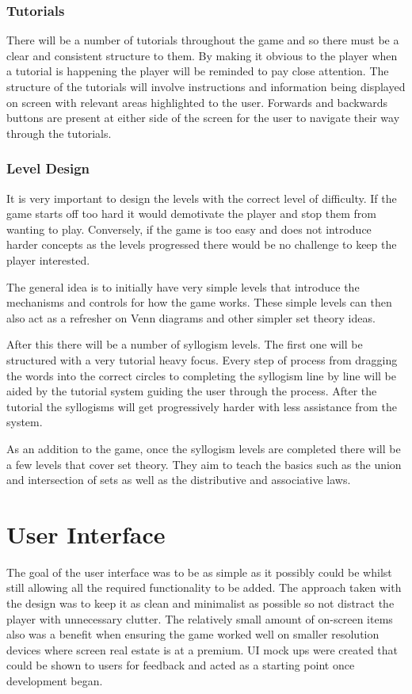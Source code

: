 \documentclass[12pt,a4paper]{report}
\begin{document}
\subsubsection{Tutorials}
There will be a number of tutorials throughout the game and so there must be a clear and consistent structure to them. By making it obvious to the player when a tutorial is happening the player will be reminded to pay close attention. The structure of the tutorials will involve instructions and information being displayed on screen with relevant areas highlighted to the user. Forwards and backwards buttons are present at either side of the screen for the user to navigate their way through the tutorials. 

\subsubsection{Level Design}
It is very important to design the levels with the correct level of difficulty. If the game starts off too hard it would demotivate the player and stop them from wanting to play. Conversely, if the game is too easy and does not introduce harder concepts as the levels progressed there would be no challenge to keep the player interested.

The general idea is to initially have very simple levels that introduce the mechanisms and controls for how the game works. These simple levels can then also act as a refresher on Venn diagrams and other simpler set theory ideas.

After this there will be a number of syllogism levels. The first one will be structured with a very tutorial heavy focus. Every step of process from dragging the words into the correct circles to completing the syllogism line by line will be aided by the tutorial system guiding the user through the process. After the tutorial the syllogisms will get progressively harder with less assistance from the system.

As an addition to the game, once the syllogism levels are completed there will be a few levels that cover set theory. They aim to teach the basics such as the union and intersection of sets as well as the distributive and associative laws. 

\section{User Interface}
The goal of the user interface was to be as simple as it possibly could be whilst still allowing all the required functionality to be added. The approach taken with the design was to keep it as clean and minimalist as possible so not distract the player with unnecessary clutter. The relatively small amount of on-screen items also was a benefit when ensuring the game worked well on smaller resolution devices where screen real estate is at a premium. UI mock ups were created that could be shown to users for feedback and acted as a starting point once development began.
\end{document}
